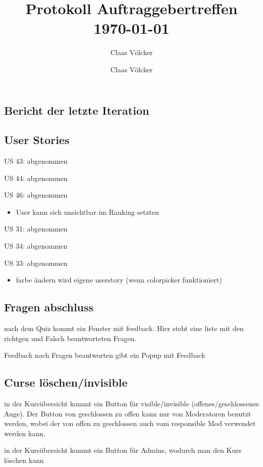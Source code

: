 \documentclass[colorback, accentcolor=tud1c, paper=a4]{tudexercise}
\title{Protokoll Auftraggebertreffen \today}
\subtitle{Claas Völcker}
\author{Claas Völcker}
\begin{document}
\maketitle

\begin{multicols}{2}

\section*{Bericht der letzte Iteration}
\subsection*{User Stories}
	\item US 43: abgenommen
	\item US 44: abgenommen
	\item US 46: abgenommen
	\begin{itemize}
		\item User kann sich unsichtbar im Ranking setzten
	\end{itemize}
	\item US 31: abgenommen
	\item US 34: abgenommen
	\item US 33: abgenommen
	\begin{itemize}
		\item farbe ändern wird eigene userstory (wenn colorpicker funktioniert)
\end{itemize}

\subsection*{Fragen abschluss}
	\item nach dem Quiz kommt ein Fenster mit feedback. Hier steht eine liste mit den richtgen und Falsch beantworteten Fragen.
	\item Feedback nach Fragen beantworten gibt ein Popup mit Feedback

\subsection*{Curse löschen/invisible}
	\item in der Kursübersicht kommt ein Button für visible/invisible (offenes/geschlossenes Auge). Der Button von geschlossen zu offen kann nur von Moderatoren benutzt werden, wobei der von offen zu geschlossen auch vom responsible Mod verwendet werden kann.
	\item in der Kursübersicht kommt ein Button für Admins, wodurch man den Kurs löschen kann


\end{multicols}
\end{document}
